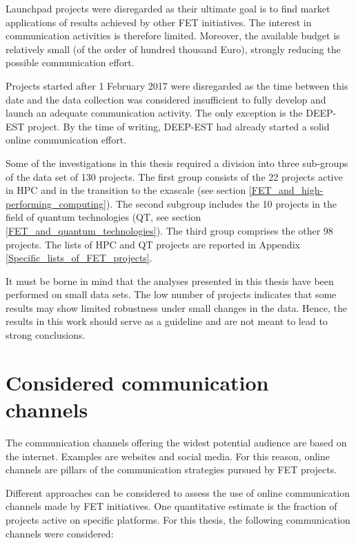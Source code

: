 Launchpad projects were disregarded as their ultimate goal is to find market applications of results achieved by other FET initiatives. The interest in communication activities is therefore limited. Moreover, the available budget is relatively small (of the order of hundred thousand Euro), strongly reducing the possible communication effort. 

Projects started after 1 February 2017 were disregarded as the time between this date and the data collection was considered insufficient to fully develop and launch an adequate communication activity. The only exception is the DEEP-EST project. By the time of writing, DEEP-EST had already started a solid online communication effort.    

Some of the investigations in this thesis required a division into three sub-groups of the data set of 130 projects. The first group consists of the 22 projects active in HPC and in the transition to the exascale (see section \ref{FET_and_high-performing_computing}). The second subgroup includes the 10 projects in the field of quantum technologies (QT, see section \ref{FET_and_quantum_technologies}). The third group comprises the other 98 projects. The lists of HPC and QT projects are reported in Appendix \ref{Specific_lists_of_FET_projects}.

It must be borne in mind that the analyses presented in this thesis have been performed on small data sets. The low number of projects indicates that some results may show limited robustness under small changes in the data. Hence, the results in this work should serve as a guideline and are not meant to lead to strong conclusions.  

\section{Considered communication channels} \label{Considered_channels}
The communication channels offering the widest potential audience are based on the internet. Examples are websites and social media. For this reason, online channels are pillars of the communication strategies pursued by FET projects. 

Different approaches can be considered to assess the use of online communication channels made by FET initiatives. One quantitative estimate is the fraction of projects active on specific platforms. For this thesis, the following communication channels were considered:   

